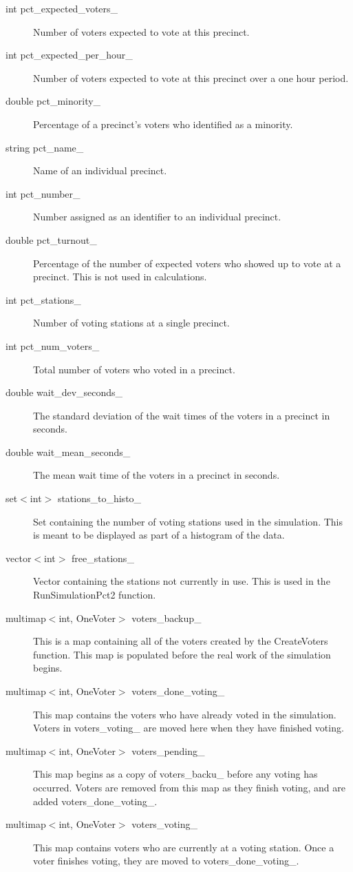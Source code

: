 \begin{description}
\item[int pct\_expected\_voters\_] Number of voters expected to vote at this precinct.
\item[int pct\_expected\_per\_hour\_] Number of voters expected to vote at this precinct over a one hour period.
\item[double pct\_minority\_] Percentage of a precinct's voters who identified as a minority.
\item[string pct\_name\_] Name of an individual precinct.
\item[int pct\_number\_] Number assigned as an identifier to an individual precinct.
\item[double pct\_turnout\_] Percentage of the number of expected voters who showed up to vote at a precinct.  This is not used in calculations.
\item[int pct\_stations\_] Number of voting stations at a single precinct.
\item[int pct\_num\_voters\_]  Total number of voters who voted in a precinct.
\item[double wait\_dev\_seconds\_] The standard deviation of the wait times of the voters in a precinct in seconds.
\item[double wait\_mean\_seconds\_] The mean wait time of the voters in a precinct in seconds.
\item[set$<$int$>$ stations\_to\_histo\_] Set containing the number of voting stations used in the simulation.  This is meant to be displayed as part of a histogram of the data.
\item[vector$<$int$>$ free\_stations\_] Vector containing the stations not currently in use.  This is used in the RunSimulationPct2 function.
\item[multimap$<$int, OneVoter$>$ voters\_backup\_] This is a map containing all of the voters created by the CreateVoters function.  This map is populated before the real work of the simulation begins.
\item[multimap$<$int, OneVoter$>$ voters\_done\_voting\_] This map contains the voters who have already voted in the simulation. Voters in voters\_voting\_ are moved here when they have finished voting.
\item[multimap$<$int, OneVoter$>$ voters\_pending\_] This map begins as a copy of voters\_backu\_ before any voting has occurred. Voters are removed from this map as they finish voting, and are added voters\_done\_voting\_.
\item[multimap$<$int, OneVoter$>$ voters\_voting\_] This map contains voters who are currently at a voting station. Once a voter finishes voting, they are moved to voters\_done\_voting\_.
\end{description}


